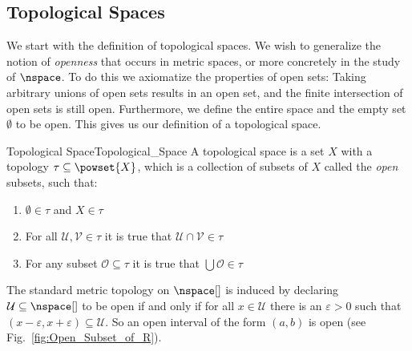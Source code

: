 \documentclass{book}                                                           %
\begin{document}
            \subsection{Topological Spaces}
                We start with the definition of topological spaces. We wish to
                generalize the notion of \textit{openness} that occurs in metric
                spaces, or more concretely in the study of
                $\nspace$. To do this we axiomatize the properties of open sets:
                Taking arbitrary unions of open sets results in an open set, and
                the finite intersection of open sets is still open. Furthermore,
                we define the entire space and the empty set $\emptyset$ to be
                open. This gives us our definition of a topological space.
                \begin{fdefinition}{Topological Space}{Topological_Space}
                    A topological space is a set $X$ with a topology
                    $\tau\subseteq\powset{X}$, which is a collection of subsets
                    of $X$ called the \textit{open} subsets, such that:
                    \begin{enumerate}
                        \item \label{def:top:Empty_and_X_Open}%
                              $\emptyset\in\tau$ and $X\in\tau$
                        \item \label{def:top:Finite_Intersections}%
                              For all $\mathcal{U},\mathcal{V}\in\tau$ it is
                              true that $\mathcal{U}\cap\mathcal{V}\in\tau$
                        \item \label{def:top:Arbitrary_Unions}%
                              For any subset $\mathcal{O}\subseteq\tau$ it is
                              true that $\bigcup\mathcal{O}\in\tau$
                    \end{enumerate}
                \end{fdefinition}
                \begin{example}
                    The standard metric topology on $\nspace[]$ is induced by
                    declaring $\mathcal{U}\subseteq\nspace[]$ to be open if and
                    only if for all $x\in\mathcal{U}$ there is an
                    $\varepsilon>0$ such that
                    $(x-\varepsilon,x+\varepsilon)\subseteq\mathcal{U}$. So an
                    open interval of the form $(a,b)$ is open
                    (see Fig.~\ref{fig:Open_Subset_of_R}).%
                \end{example}
\end{document}
